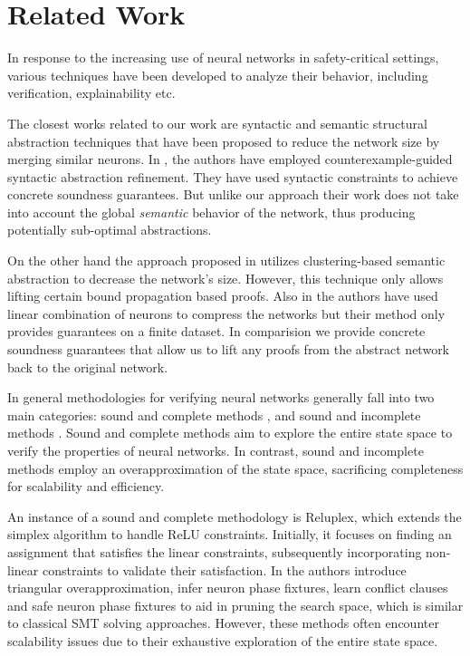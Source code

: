 \section{Related Work}

In response to the increasing use of neural networks in safety-critical settings, 
various techniques have been developed to analyze their behavior, including 
verification, explainability etc. 

The closest works related to our work are 
syntactic and semantic structural abstraction techniques that
have been proposed to reduce the network size by merging similar neurons. 
In \cite {cegar-nn, cegarette}, the authors have 
employed counterexample-guided syntactic abstraction
refinement. They have used syntactic constraints to achieve concrete soundness 
guarantees. But unlike our approach their work does not take into account the global 
\textit{semantic} behavior of the network, thus producing potentially sub-optimal
abstractions.

On the other hand the approach proposed in \cite{deep-abstract} utilizes
clustering-based semantic abstraction to decrease the network's size. 
However, this technique only allows lifting certain bound propagation
based proofs. Also in \cite{lin-comb-abs-jan} the authors have used linear 
combination of neurons to compress the networks but their method only provides 
guarantees on a finite dataset. In comparision we provide concrete soundness
guarantees that allow us to lift any proofs from the abstract 
network back to the original network.

In general methodologies for verifying neural networks generally fall into two main
categories: sound and complete methods \cite{reluplex, formal-ver-piece-wise, 
comp-reachability-analysis, comp-milp, comp-out-range, comp-max-resilience, marabou,
comp-safety-ver-dnn, beta-crown, alpha-crown-bab-fnc, gcp-crown}, and sound and
incomplete methods \cite{deeppoly, crown, incomp-dual-approach, incomp-abs-inp, 
incomp-robustness-certi, incomp-boost-robustness}. Sound and complete methods aim to 
explore the entire state space to verify the properties of neural networks.
In contrast, sound and incomplete methods employ an overapproximation
of the state space, sacrificing completeness for 
scalability and efficiency.

An instance of a sound and complete methodology is Reluplex, which extends the 
simplex algorithm \cite{simplex} to 
handle ReLU constraints. Initially, it focuses on finding an assignment that 
satisfies the linear constraints, subsequently incorporating non-linear constraints 
to validate their satisfaction. In \cite{formal-ver-piece-wise}
the authors introduce triangular overapproximation, infer neuron phase fixtures,
learn conflict clauses and safe neuron phase fixtures to aid in pruning the search 
space, which is similar to classical SMT solving approaches. However, these methods
often encounter scalability issues due to their exhaustive exploration of the
entire state space. 

